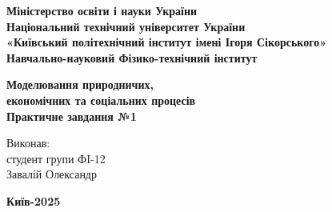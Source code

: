 \documentclass[a4paper,12pt]{article}
\begin{document}
    \pagestyle{fancy}
    \fancyhead{}
    \begin{center}
        \large{\textbf{Міністерство освіти і науки України\\
                Національний технічний університет України\\
                «Київський політехнічний інститут імені Ігоря Сікорського»\\
                Навчально-науковий Фізико-технічний інститут}}\\
        \hfill \break \hfill \break \hfill\break \hfill \break \hfill \break \hfill \break \hfill \break
        \hfill \break \hfill \break \hfill \break
        \begin{center}
            \normalsize{\textbf{Моделювання природничих, \\ економічних та соціальних процесів\\
            Практичне завдання №1}}
        \end{center}
    \end{center}
    \hfill \break \hfill \break \hfill \break \hfill \break \hfill \break \hfill \break \hfill \break
    \hfill \break \hfill \break \hfill \break \hfill \break 
    \begin{flushright}
        \large{ \hspace{35pt} Виконав:\\
            студент групи ФI-12\\
            Завалій Олександр\\} 
    \end{flushright}
    \hfill \break \hfill \break 
    \hfill \break \hfill \break \hfill \break \hfill \break \hfill \break \hfill \break \hfill \break
    \hfill \break
    \begin{center} \textbf{Київ-2025} \end{center}
    \thispagestyle{empty}
\end{document}
